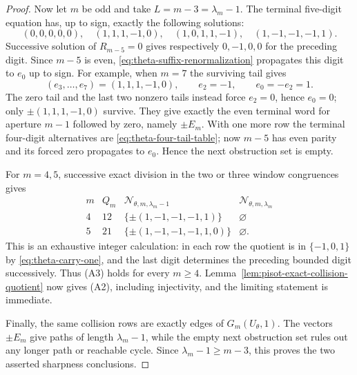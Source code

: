 \begin{proof}
Now let $m$ be odd and take $L=m-3=\lambda_m-1$.  The terminal five-digit
equation has, up to sign, exactly the following solutions:
\begin{equation}
(0,0,0,0,0),\quad
(1,1,1,-1,0),\quad
(1,0,1,1,-1),\quad
(1,-1,-1,-1,1).
\label{eq:theta-five-tail-table}
\end{equation}
Successive solution of $R_{m-5}=0$ gives respectively
$0,-1,0,0$ for the preceding digit.  Since $m-5$ is even,
\eqref{eq:theta-suffix-renormalization} propagates this digit to $e_0$ up
to sign.  For example, when $m=7$ the surviving tail gives
\[
(e_3,\ldots,e_7)=(1,1,1,-1,0),\qquad e_2=-1,\qquad e_0=-e_2=1.
\]
The zero tail and the last two nonzero tails instead force $e_2=0$, hence
$e_0=0$; only $\pm(1,1,1,-1,0)$ survive.  They give exactly the even
terminal word for aperture $m-1$ followed by zero, namely $\pm E_m$.
With one more row the terminal four-digit alternatives are
\eqref{eq:theta-four-tail-table}; now $m-5$ has even parity and its forced
zero propagates to $e_0$.  Hence the next obstruction set is empty.

For $m=4,5$, successive exact division in the two or three window
congruences gives
\[
\begin{array}{c|c|c|c}
m&Q_m&\mathcal N_{\theta,m,\lambda_m-1}
&\mathcal N_{\theta,m,\lambda_m}\\ \hline
4&12&\{\pm(1,-1,-1,-1,1)\}&\varnothing\\
5&21&\{\pm(1,-1,-1,-1,1,0)\}&\varnothing.
\end{array}
\]
This is an exhaustive integer calculation: in each row the quotient is in
$\{-1,0,1\}$ by \eqref{eq:theta-carry-one}, and the last digit determines
the preceding bounded digit successively.  Thus \textup{(A3)} holds for
every $m\ge4$.  Lemma~\ref{lem:pisot-exact-collision-quotient} now gives
\textup{(A2)}, including injectivity, and the limiting statement is
immediate.

Finally, the same collision rows are exactly edges of $G_m(U_\theta,1)$.
The vectors $\pm E_m$ give paths of length $\lambda_m-1$, while the empty
next obstruction set rules out any longer path or reachable cycle.  Since
$\lambda_m-1\ge m-3$, this proves the two asserted sharpness conclusions.
\end{proof}
